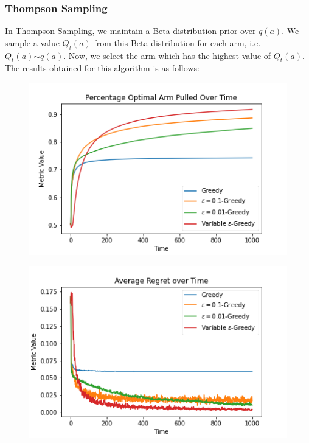 \documentclass{article}
\begin{document}
		\subsubsection{Thompson Sampling}
		In Thompson Sampling, we maintain a Beta distribution prior over $q(a)$. We sample a value $Q_{t}(a)$ from this Beta distribution for each arm, i.e.
		$Q_{t}(a) \stackrel{}{\sim} q(a)$. Now, we select the arm which has the highest value of $Q_{t}(a)$. The results obtained for this algorithm is as 
		follows:
		
		\begin{figure}[H]
		\graphicspath{ {../Experiments/Bernoulli_2_Thompson_Sampling/} }
		\centering
		\begin{minipage}{.5\textwidth}
		  \centering
		  \includegraphics[width=\linewidth]{Percentage_Optimal_Arm_Pulled_Over_Time.png}
		  \label{fig:test1}
		\end{minipage}%
		\begin{minipage}{.5\textwidth}
		  \centering
		  \includegraphics[width=\linewidth]{Average_Regret_over_Time.png}
		  \label{fig:test2}
		\end{minipage}
		\end{figure}
		
\end{document}
